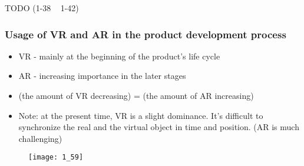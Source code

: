 \documentclass{standalone}
\begin{document}
TODO (1-38 ~ 1-42)

\subsubsection*{Usage of VR and AR in the product development process}

\begin{itemize}
	\item VR - mainly at the beginning of the product's life cycle
	\item AR - increasing importance in the later stages 
	\item (the amount of VR decreasing) = (the amount of AR increasing)
	\item Note: at the present time, VR is a slight dominance. It's difficult to synchronize the real and the virtual object in time and position. (AR is much challenging)
\end{itemize}

\begin{figure}[H]
	\texttt{[image: 1\_59]}
\end{figure}
\end{document}
